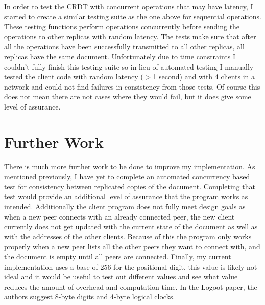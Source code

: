 \documentclass[11pt]{article}
\begin{document}
In order to test the CRDT with concurrent operations that may have latency, I started to create a similar testing suite as the one above for sequential operations. These testing functions perform operations concurrently before sending the operations to other replicas with random latency. The tests make sure that after all the operations have been successfully transmitted to all other replicas, all replicas have the same document. Unfortunately due to time constraints I couldn't fully finish this testing suite so in lieu of automated testing I manually tested the client code with random latency ($>$1 second) and with 4 clients in a network and could not find failures in consistency from those tests. Of course this does not mean there are not cases where they would fail, but it does give some level of assurance.


\pagebreak

\section{Further Work}
There is much more further work to be done to improve my implementation. As mentioned previously, I have yet to complete an automated concurrency based test for consistency between replicated copies of the document. Completing that test would provide an additional level of assurance that the program works as intended. Additionally the client program does not fully meet design goals as when a new peer connects with an already connected peer, the new client currently does not get updated with the current state of the document as well as with the addresses of the other clients. Because of this the program only works properly when a new peer lists all the other peers they want to connect with, and the document is empty until all peers are connected. Finally, my current implementation uses a base of 256 for the positional digit, this value is likely not ideal and it would be useful to test out different values and see what value reduces the amount of overhead and computation time. In the Logoot paper, the authors suggest 8-byte digits and 4-byte logical clocks.
\end{document}

